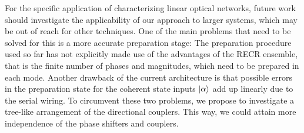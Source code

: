 For the specific application of characterizing linear optical networks, future work should investigate the applicability of our approach to larger systems, which may be out of reach for other techniques.
One of the main problems that need to be solved for this is a more accurate preparation stage:
The preparation procedure used so far has not explicitly made use of the advantages of the RECR ensemble, that is the finite number of phases and magnitudes, which need to be prepared in each mode.
Another drawback of the current architecture is that possible errors in the preparation state for the coherent state inputs $\ket{\alpha}$ add up linearly due to the serial wiring.
To circumvent these two problems, we propose to investigate a tree-like arrangement of the directional couplers.
This way, we could attain more independence of the phase shifters and couplers.
